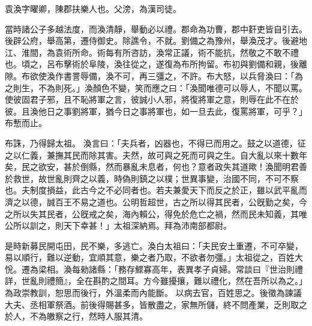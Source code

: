 \begin{pinyinscope}
 
 
 袁渙字曜卿，陳郡扶樂人也。父滂，為漢司徒。
 
 
 當時諸公子多越法度，而渙清靜，舉動必以禮。郡命為功曹，郡中姧吏皆自引去。後辟公府，舉高第，遷侍御史。除譙令，不就。劉備之為豫州，舉渙茂才。後避地江、淮間，為袁術所命。術每有所咨訪，渙常正議，術不能抗，然敬之不敢不禮也。頃之，呂布擊術於阜陵，渙往從之，遂復為布所拘留。布初與劉備和親，後離隙。布欲使渙作書詈辱備，渙不可，再三彊之，不許。布大怒，以兵脅渙曰：「為之則生，不為則死。」渙顏色不變，笑而應之曰：「渙聞唯德可以辱人，不聞以罵。使彼固君子邪，且不恥將軍之言，彼誠小人邪，將復將軍之意，則辱在此不在於彼。且渙他日之事劉將軍，猶今日之事將軍也，如一旦去此，復罵將軍，可乎？」布慙而止。
 
 
布誅，乃得歸太祖。
 渙言曰：「夫兵者，凶器也，不得已而用之。鼓之以道德，征之以仁義，兼撫其民而除其害。夫然，故可與之死而可與之生。自大亂以來十數年矣，民之欲安，甚於倒縣，然而暴亂未息者，何也？意者政失其道歟！渙聞明君善於救世，故世亂則齊之以義，時偽則鎮之以樸；世異事變，治國不同，不可不察也。夫制度損益，此古今之不必同者也。若夫兼愛天下而反之於正，雖以武平亂而濟之以德，誠百王不易之道也。公明哲超世，古之所以得其民者，公旣勤之矣，今之所以失其民者，公旣戒之矣，海內賴公，得免於危亡之禍，然而民未知義，其唯公所以訓之，則天下幸甚！」太祖深納焉。拜為沛南部都尉。
 
 
是時新募民開屯田，民不樂，多逃亡。渙白太祖曰：「夫民安土重遷，不可卒變，易以順行，難以逆動，宜順其意，樂之者乃取，不欲者勿彊。」太祖從之，百姓大恱。遷為梁相。渙每勑諸縣：「務存鰥寡高年，表異孝子貞婦。常談曰『世治則禮詳，世亂則禮簡』，全在斟酌之間耳。方今雖擾攘，難以禮化，然在吾所以為之。」為政崇教訓，恕思而後行，外溫柔而內能斷。
 以病去官，百姓思之。後徵為諫議大夫、丞相軍祭酒。前後得賜甚多，皆散盡之，家無所儲，終不問產業，乏則取之於人，不為皦察之行，然時人服其清。
 

\end{pinyinscope}
